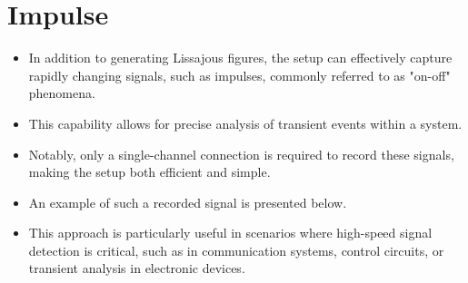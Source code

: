 \documentclass[a4paper,12pt]{article}
\numberwithin{equation}{section} %
\begin{document}
\section{Impulse}
\begin{itemize}
\item In addition to generating Lissajous figures, the setup can effectively capture rapidly changing signals, such as impulses, commonly referred to as "on-off" phenomena.
\item This capability allows for precise analysis of transient events within a system.
\item Notably, only a single-channel connection is required to record these signals, making the setup both efficient and simple.
\item An example of such a recorded signal is presented below.
\item This approach is particularly useful in scenarios where high-speed signal detection is critical, such as in communication systems, control circuits, or transient analysis in electronic devices.
\end{itemize}
\end{document}
